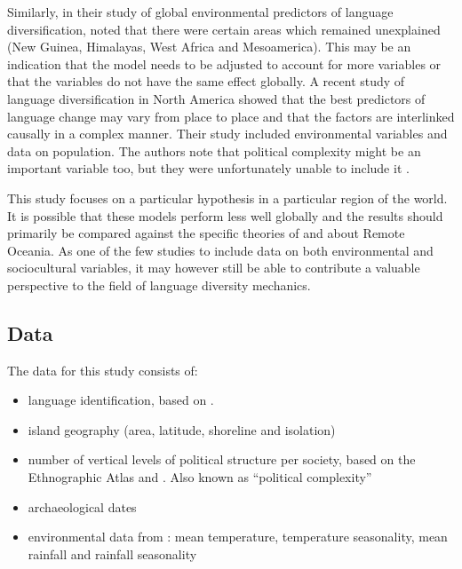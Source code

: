 \documentclass[a4paper,10pt]{article} %
\begin{document}

Similarly, in their study of global environmental predictors of language diversification, \citet{hua2019ecological} noted that there were certain areas which remained unexplained (New Guinea, Himalayas, West Africa and Mesoamerica). This may be an indication that the model needs to be adjusted to account for more variables or that the variables do not have the same effect globally. A recent study of language diversification in North America \citep{Pacheco_Coelho_2019} showed that the best predictors of language change may vary from place to place and that the factors are interlinked causally in a complex manner. Their study included environmental variables and data on population. The authors note that political complexity might be an important variable too, but they were unfortunately unable to include it \citep[7]{Pacheco_Coelho_2019}.

This study focuses on a particular hypothesis in a particular region of the world. It is possible that these models perform less well globally and the results should primarily be compared against the specific theories of \citet{lynch1981melanesian} and \citet{pawley81, pawley2007} about Remote Oceania. As one of the few studies to include data on both environmental and sociocultural variables, it may however still be able to contribute a valuable perspective to the field of language diversity mechanics.

\subsection{Data}
The data for this study consists of:

\begin{itemize}
\item language identification, based on \citet{glottolog40}.
\item island geography (area, latitude, shoreline and isolation)
\item number of vertical levels of political structure per society, based on the Ethnographic Atlas \citep{gray1998ethnographic, d_place_all} and \citet{sheehan2018coevolution}. Also known as ``political complexity''
\item archaeological dates \citep{intoh2007reconnaissance, intoh2008ongoing, rieth_cochrane_2018, levin_seikel_miles_2019, pol_outliers_stat_art, Napolitano_et_al_yap}
\item environmental data from \citet{ecoclimate}: mean temperature, temperature seasonality, mean rainfall and rainfall seasonality
\end{itemize}
\end{document}
